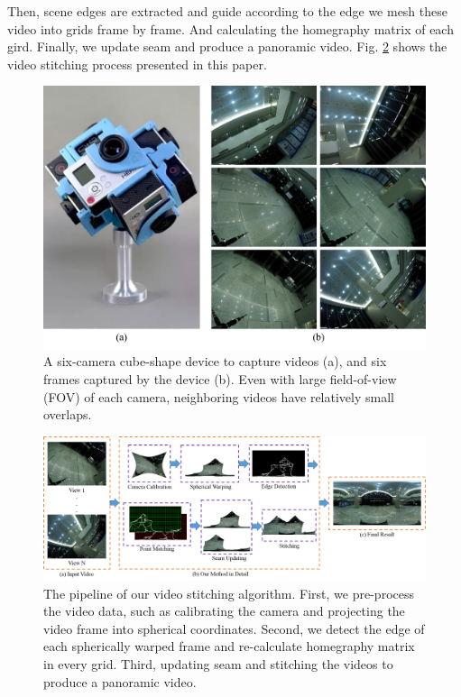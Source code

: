 \documentclass[conference]{IEEEtran}
\begin{document}
Then, scene edges are extracted and guide according to the edge we mesh these video into grids frame by frame.
And calculating the homegraphy matrix of each gird. Finally, we update seam and produce a panoramic video.
Fig. \ref{fig:res} shows the video stitching process presented in this paper.

\begin{figure}[t]
\centering
\includegraphics[scale=0.36]{picture34.png}
\caption{A six-camera cube-shape device to capture videos (a), and six frames captured by the device (b). Even with large field-of-view (FOV) of each camera, neighboring videos have relatively small overlaps. }
\label{fig:equipment}
\end{figure}

\begin{figure}
\centering
\includegraphics[scale=0.54]{picture44.png}
\caption{The pipeline of our video stitching algorithm. First, we pre-process the video data, such as calibrating the camera
and projecting the video frame into spherical coordinates. Second, we detect the edge of each spherically
warped frame and re-calculate
homegraphy matrix in every grid. Third, updating seam and stitching the videos to produce a panoramic video.}
\label{fig:res}
\end{figure}
\end{document}
